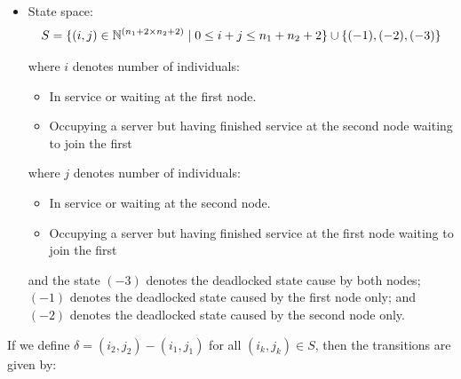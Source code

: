\documentclass{article}
\begin{document}
\begin{itemize}
    \item State space:
        \[S = \{(i,j)\in\mathbb{N}^{(n_1+2\times n_2+2)} \nonscript\; | \nonscript\; 0 \leq i + j \leq n_1 + n_2 + 2
        \}\cup\{(-1), (-2), (-3)\}\]

        where \(i\) denotes number of individuals:
            \begin{itemize}
                \item In service or waiting at the first node.
                \item Occupying a server but having finished service at the
                    second node waiting to join the first
            \end{itemize}
        where \(j\) denotes number of individuals:
            \begin{itemize}
                \item In service or waiting at the second node.
                \item Occupying a server but having finished service at the
                    first node waiting to join the first
            \end{itemize}
        and the state $(-3)$ denotes the deadlocked state cause by both nodes; $(-1)$ denotes the deadlocked state caused by the first node only; and $(-2)$ denotes the deadlocked state caused by the second node only.
\end{itemize}

If we define $\delta = (i_2, j_2) - (i_1, j_1)$ for all $(i_k, j_k) \in S$, then the transitions are given by:
\end{document}
